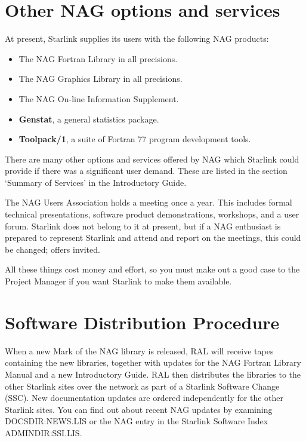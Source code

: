 \section{Other NAG options and services}

At present, Starlink supplies its users with the following NAG products:

\begin{itemize}
\item The NAG Fortran Library in all precisions.
\item The NAG Graphics Library in all precisions.
\item The NAG On-line Information Supplement.
\item {\bf Genstat}, a general statistics package.
\item {\bf Toolpack/1}, a suite of Fortran 77 program development tools.
\end{itemize}

There are many other options and services offered by NAG which Starlink could
provide if there was a significant user demand. These are listed in the section
`Summary of Services' in the Introductory Guide.

The NAG Users Association holds a meeting once a year. This includes formal
technical presentations, software product demonstrations, workshops, and a user
forum. Starlink does not belong to it at present, but if a NAG enthusiast is
prepared to represent Starlink and attend and report on the meetings, this
could be changed; offers invited.

All these things cost money and effort, so you must make out a good case to the
Project Manager if you want Starlink to make them available.

\section{Software Distribution Procedure}

When a new Mark of the NAG library is released, RAL will receive tapes
containing the new libraries, together with updates for the NAG Fortran Library
Manual and a new Introductory Guide. RAL then distributes the libraries to the
other Starlink sites over the network as part of a Starlink Software Change
(SSC). New documentation updates are ordered independently for the other
Starlink sites. You can find out about recent NAG updates by examining
DOCSDIR:NEWS.LIS or the NAG entry in the Starlink Software Index
ADMINDIR:SSI.LIS.

